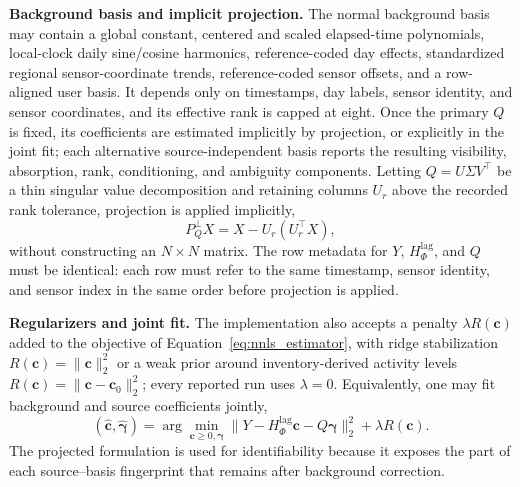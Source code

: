 \noindent\textbf{Background basis and implicit projection.}
The normal background basis may contain a global constant, centered and scaled
elapsed-time polynomials, local-clock daily sine/cosine harmonics,
reference-coded day effects, standardized regional sensor-coordinate trends,
reference-coded sensor offsets, and a row-aligned user basis.  It depends only
on timestamps, day labels, sensor identity, and sensor coordinates, and its
effective rank is capped at eight.  Once the primary \(Q\) is fixed, its
coefficients are estimated implicitly by projection, or explicitly in the joint
fit; each alternative source-independent basis reports the resulting visibility,
absorption, rank, conditioning, and ambiguity components.  Letting
\(Q=U\Sigma V^\top\) be a thin singular value decomposition and retaining
columns \(U_r\) above the recorded rank tolerance, projection is applied
implicitly,
\begin{equation}
P_Q^\perp X=X-U_r(U_r^\top X),
\label{eq:implicit_background_projection}
\end{equation}
without constructing an \(N\times N\) matrix.  The row metadata for \(Y\),
\(H_\Phi^{\mathrm{lag}}\), and \(Q\) must be identical: each row must refer to the
same timestamp, sensor identity, and sensor index in the same order before
projection is applied.

\noindent\textbf{Regularizers and joint fit.}
The implementation also accepts a penalty \(\lambda R(\mathbf c)\) added to the
objective of Equation~\ref{eq:nnls_estimator}, with ridge stabilization
\(R(\mathbf c)=\|\mathbf c\|_2^2\) or a weak prior around inventory-derived activity
levels \(R(\mathbf c)=\|\mathbf c-\mathbf c_0\|_2^2\); every reported run uses
\(\lambda=0\).  Equivalently, one may fit background and source coefficients jointly,
\begin{equation}
(\widehat{\mathbf c},\widehat{\boldsymbol\gamma})
=\arg\min_{\mathbf c\ge 0,\boldsymbol\gamma}
\|Y-H_{\Phi}^{\mathrm{lag}}\mathbf c-Q\boldsymbol\gamma\|_2^2
+\lambda R(\mathbf c).
\label{eq:joint_fit}
\end{equation}
The projected formulation is used for identifiability because it exposes the
part of each source--basis fingerprint that remains after background correction.

